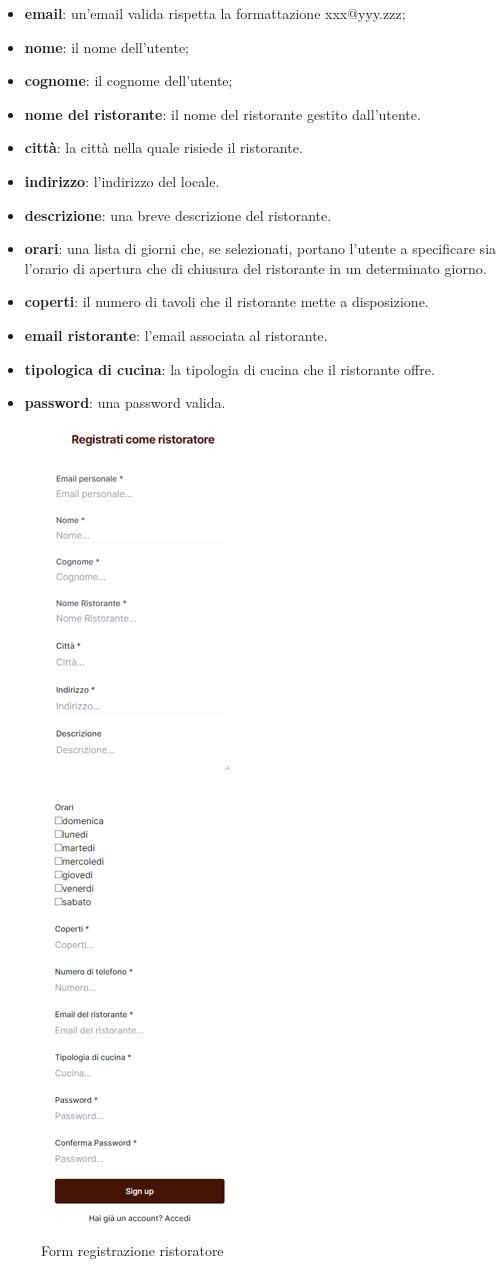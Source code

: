 \begin{itemize}
    \item \textbf{email}: un'email valida rispetta la formattazione xxx@yyy.zzz;
    \item \textbf{nome}: il nome dell'utente;
    \item \textbf{cognome}: il cognome dell'utente;
    \item \textbf{nome del ristorante}: il nome del ristorante gestito dall'utente.
    \item \textbf{città}: la città nella quale risiede il ristorante.
    \item \textbf{indirizzo}: l'indirizzo del locale.
    \item \textbf{descrizione}: una breve descrizione del ristorante.
    \item \textbf{orari}: una lista di giorni che, se selezionati, portano l'utente a specificare sia l'orario di apertura che di chiusura del ristorante in un determinato giorno.
    \item \textbf{coperti}: il numero di tavoli che il ristorante mette a disposizione.
    \item \textbf{email ristorante}: l'email associata al ristorante.
    \item \textbf{tipologica di cucina}: la tipologia di cucina che il ristorante offre.
    \item \textbf{password}: una password valida.
\end{itemize}

\begin{figure}[H]
    \centering
    \includegraphics[width=0.25\linewidth]{img/sign-up-admin.png}
    \caption{Form registrazione ristoratore}
    \label{fig:form_signup}
\end{figure}


